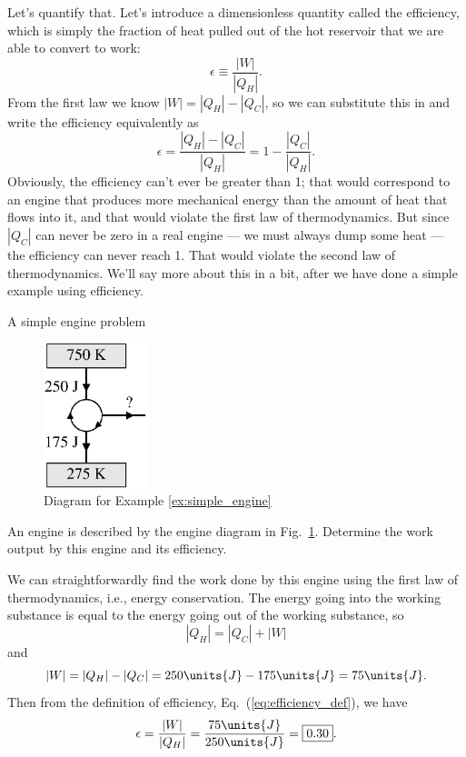 Let's quantify that.  Let's introduce a dimensionless quantity called
the efficiency, which is simply the fraction of heat pulled out of the
hot reservoir that we are able to convert to work:
\begin{equation}
\epsilon \equiv \frac{|W|}{|Q_H|}.
\label{eq:efficiency_def}
\end{equation}
From the first law we know $|W|=|Q_H|-|Q_C|$, so we can substitute
this in and write the efficiency equivalently as
\begin{equation}
\epsilon = \frac{|Q_H|-|Q_C|}{|Q_H|} = 1 - \frac{|Q_C|}{|Q_H|}.
\label{eq:general_efficiency}
\end{equation}
Obviously, the efficiency can't ever be greater than 1; that would
correspond to an engine that produces more mechanical energy than the
amount of heat that flows into it, and that would violate the first
law of thermodynamics.  But since
$|Q_C|$ can never be zero in a real engine --- we must always dump
some heat --- the efficiency can never reach 1.   That would violate the
second law of thermodynamics.  We'll say more about this in a bit,
after we have done a simple example using efficiency.

\begin{example}{A simple engine problem}
\label{ex:simple_engine}

\begin{figure}[t]
\begin{center}
\includegraphics[width=1.2in]{heat_engines/engine_for_example.eps}
\caption{Diagram for Example \ref{ex:simple_engine}}
\label{fig:engine_for_example}
\end{center}
\end{figure}
An engine is described by the engine diagram in
Fig.~\ref{fig:engine_for_example}.  Determine the work output by this
engine and its efficiency.

\solution
We can straightforwardly find the work done
by this engine using the first law of thermodynamics, i.e., energy
conservation.  The energy going into the working substance is
equal to the energy going out of the working substance, so
\begin{equation}
|Q_H| = |Q_C| + |W|
\end{equation}
and
\begin{equation}
|W| = |Q_H| - |Q_C| = 250\units{J} - 175\units{J} = 75\units{J} .
\end{equation}
Then from the definition of efficiency, Eq.~(\ref{eq:efficiency_def}),
we have
\begin{equation*}
\epsilon = \frac{|W|}{|Q_H|}  = \frac{75\units{J}}{250\units{J}} = \boxed{0.30}.
\end{equation*}
\end{example}

